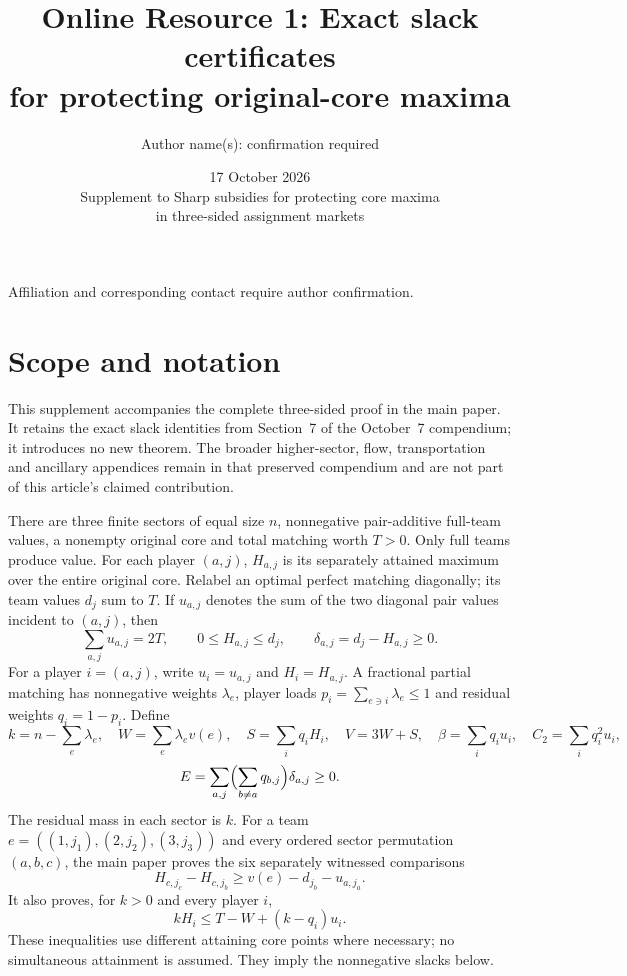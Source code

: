 \documentclass[11pt]{article}
\title{Online Resource 1: Exact slack certificates\\for protecting original-core maxima}
\author{Author name(s): confirmation required}
\date{17 October 2026\\[2pt]\small Supplement to Sharp subsidies for protecting core maxima\\in three-sided assignment markets}
\theoremstyle{remark}
\begin{document}
\maketitle
\noindent Affiliation and corresponding contact require author confirmation.

\section{Scope and notation}
This supplement accompanies the complete three-sided proof in the main paper.
It retains the exact slack identities from Section~7 of the October~7
compendium; it introduces no new theorem. The broader higher-sector, flow,
transportation and ancillary appendices remain in that preserved compendium
and are not part of this article's claimed contribution.

There are three finite sectors of equal size $n$, nonnegative pair-additive full-team
values, a nonempty original core and total matching worth $T>0$. Only full
teams produce value. For each player $(a,j)$, $H_{a,j}$ is its separately
attained maximum over the entire original core. Relabel an optimal perfect
matching diagonally; its team values $d_j$ sum to $T$. If $u_{a,j}$ denotes
the sum of the two diagonal pair values incident to $(a,j)$, then
\[
\sum_{a,j}u_{a,j}=2T,\qquad 0\le H_{a,j}\le d_j,
\qquad\delta_{a,j}=d_j-H_{a,j}\ge0.
\]
For a player $i=(a,j)$, write $u_i=u_{a,j}$ and $H_i=H_{a,j}$.
A fractional partial matching has nonnegative weights $\lambda_e$, player
loads $p_i=\sum_{e\ni i}\lambda_e\le1$ and residual weights $q_i=1-p_i$.
Define
\[
 k=n-\sum_e\lambda_e,\quad W=\sum_e\lambda_ev(e),\quad
 S=\sum_iq_iH_i,\quad V=3W+S,\quad
 \beta=\sum_iq_iu_i,\quad C_2=\sum_iq_i^2u_i,
\]
\[
 E=\sum_{a,j}\Bigl(\sum_{b\ne a}q_{b,j}\Bigr)\delta_{a,j}\ge0.
\]
The residual mass in each sector is $k$. For a team
$e=((1,j_1),(2,j_2),(3,j_3))$ and every ordered sector permutation $(a,b,c)$,
the main paper proves the six separately witnessed comparisons
\begin{equation}\label{eq:comparison}
 H_{c,j_c}-H_{c,j_b}\ge v(e)-d_{j_b}-u_{a,j_a}.
\end{equation}
It also proves, for $k>0$ and every player $i$,
\[
 kH_i\le T-W+(k-q_i)u_i.
\]
These inequalities use different attaining core points where necessary;
no simultaneous attainment is assumed. They imply the nonnegative slacks below.
\end{document}

